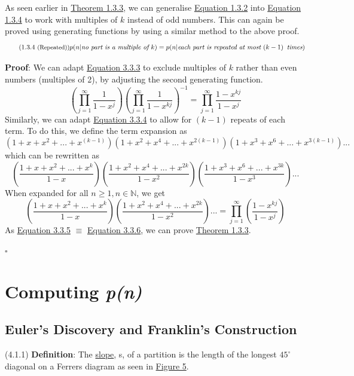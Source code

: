 \documentclass{article}
\newcommand{\N}{\mathbb{N}}
\newcommand{\definition}[2]{(#1) \textbf{Definition}: #2}
\newcommand{\proof}[1]{\textbf{Proof}: #1 \begin{flushright}\(\square\)\end{flushright}}
\begin{document}
\noindent As seen earlier in \hyperref[thm:1.3.3]{Theorem 1.3.3}, we can generalise \hyperref[eq:1.3.2]{Equation 1.3.2} into \hyperref[eq:1.3.4]{Equation 1.3.4} to work with multiples of \(k\) instead of odd numbers. This can again be proved using generating functions by using a similar method to the above proof.
\begin{equation}\tag{1.3.4 \small{(Repeated)}}
    p(n|\textit{no part is a multiple of } k) = p(n|\textit{each part is repeated at most } (k-1) \, \textit{ times})
\end{equation}

\noindent\proof{We can adapt \hyperref[eq:3.3.3]{Equation 3.3.3} to exclude multiples of \(k\) rather than even numbers (multiples of 2), by adjusting the second generating function.
\begin{equation}\tag{3.3.5}\label{eq:3.3.5}
    \left(\prod^\infty_{j=1} \frac{1}{1-x^{j}}\right)\left(\prod^\infty_{j=1} \frac{1}{1-x^{kj}}\right)^{-1} = \prod^\infty_{j=1}\frac{1-x^{kj}}{1-x^j}
\end{equation}
Similarly, we can adapt \hyperref[eq:3.3.4]{Equation 3.3.4} to allow for \((k-1)\) repeats of each term. To do this, we define the term expansion as 
\[\left(1+x+x^2+...+x^{(k-1)}\right)\left(1+x^2+x^4+...+x^{2(k-1)}\right)\left(1+x^3+x^6+...+x^{3(k-1)}\right)...\]
which can be rewritten as
\[\left(\frac{1+x+x^2+...+x^k}{1-x}\right)\left(\frac{1+x^2+x^4+...+x^{2k}}{1-x^2}\right)\left(\frac{1+x^3+x^6+...+x^{3k}}{1-x^3}\right)...\]
When expanded for all \(n\geq1, n \in \N\), we get 
\begin{equation}\tag{3.3.6}\label{eq:3.3.6}
    \left(\frac{1+x+x^2+...+x^k}{1-x}\right)\left(\frac{1+x^2+x^4+...+x^{2k}}{1-x^2}\right)... = \prod^\infty_{j=1}\left(\frac{1-x^{kj}}{1-x^j}\right)
\end{equation}
As \hyperref[eq:3.3.5]{Equation 3.3.5} \(\equiv\) \hyperref[eq:3.3.6]{Equation 3.3.6}, we can prove \hyperref[thm:1.3.3]{Theorem 1.3.3}.}

\section{Computing \textit{p(n)}}

\subsection{Euler's Discovery and Franklin's Construction}

\definition{4.1.1}{The \underline{slope}, s, of a partition is the length of the longest \(45^\circ\) diagonal on a Ferrers diagram as seen in \hyperref[fig:5]{Figure 5}.}
\end{document}
